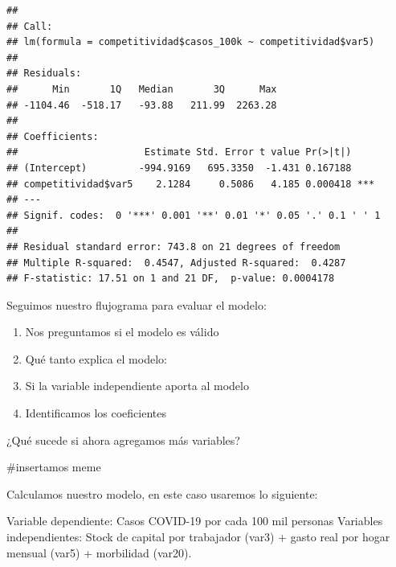 \documentclass[
]{article}
\newenvironment{Shaded}{\begin{snugshade}}{\end{snugshade}}
\newcommand{\CommentTok}[1]{\textcolor[rgb]{0.56,0.35,0.01}{\textit{#1}}}
\newcommand{\FunctionTok}[1]{\textcolor[rgb]{0.00,0.00,0.00}{#1}}
\newcommand{\NormalTok}[1]{#1}
\newcommand{\OtherTok}[1]{\textcolor[rgb]{0.56,0.35,0.01}{#1}}
\newcommand{\SpecialCharTok}[1]{\textcolor[rgb]{0.00,0.00,0.00}{#1}}
\providecommand{\tightlist}{%
  \setlength{\itemsep}{0pt}\setlength{\parskip}{0pt}}
\begin{document}
\begin{verbatim}
## 
## Call:
## lm(formula = competitividad$casos_100k ~ competitividad$var5)
## 
## Residuals:
##      Min       1Q   Median       3Q      Max 
## -1104.46  -518.17   -93.88   211.99  2263.28 
## 
## Coefficients:
##                      Estimate Std. Error t value Pr(>|t|)    
## (Intercept)         -994.9169   695.3350  -1.431 0.167188    
## competitividad$var5    2.1284     0.5086   4.185 0.000418 ***
## ---
## Signif. codes:  0 '***' 0.001 '**' 0.01 '*' 0.05 '.' 0.1 ' ' 1
## 
## Residual standard error: 743.8 on 21 degrees of freedom
## Multiple R-squared:  0.4547, Adjusted R-squared:  0.4287 
## F-statistic: 17.51 on 1 and 21 DF,  p-value: 0.0004178
\end{verbatim}

Seguimos nuestro flujograma para evaluar el modelo:

\begin{enumerate}
\def\labelenumi{\arabic{enumi}.}
\tightlist
\item
  Nos preguntamos si el modelo es válido
\item
  Qué tanto explica el modelo:
\item
  Si la variable independiente aporta al modelo
\item
  Identificamos los coeficientes
\end{enumerate}

¿Qué sucede si ahora agregamos más variables?

\#insertamos meme

Calculamos nuestro modelo, en este caso usaremos lo siguiente:

Variable dependiente: Casos COVID-19 por cada 100 mil personas Variables
independientes: Stock de capital por trabajador (var3) + gasto real por
hogar mensual (var5) + morbilidad (var20).

\begin{Shaded}
\end{Shaded}
\end{document}
